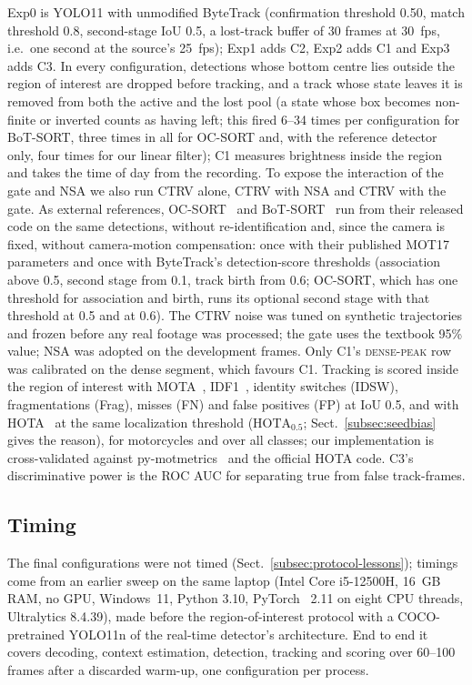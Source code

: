 \documentclass[twocolumn]{svjour3}
\begin{document}
Exp0 is YOLO11 with unmodified ByteTrack (confirmation threshold 0.50, match
threshold 0.8, second-stage IoU 0.5, a lost-track buffer of 30 frames at 30~fps,
i.e.\ one second at the source's 25~fps); Exp1 adds C2, Exp2 adds C1 and Exp3
adds C3. In every configuration, detections whose bottom centre lies outside the
region of interest are dropped before tracking, and a track whose state leaves
it is removed from both the active and the lost pool (a state whose box becomes
non-finite or inverted counts as having left; this fired 6--34 times per
configuration for BoT-SORT, three times in all for OC-SORT and, with the
reference detector only, four times for our linear filter); C1 measures
brightness inside the region and takes the time of day from the recording. To expose the interaction of the gate and NSA we also run
CTRV alone, CTRV with NSA and CTRV with the gate. As external references,
OC-SORT~\cite{Cao2023_ocsort} and BoT-SORT~\cite{Aharon2022_botsort} run from
their released code on the same detections, without re-identification and,
since the camera is fixed, without camera-motion compensation: once with their
published MOT17 parameters and once with ByteTrack's detection-score thresholds
(association above 0.5, second stage from 0.1, track birth from 0.6; OC-SORT,
which has one threshold for association and birth, runs its optional second
stage with that threshold at 0.5 and at 0.6). The CTRV noise was tuned on
synthetic trajectories and frozen before any real footage was processed; the gate
uses the textbook 95\% value; NSA was adopted on the development frames. Only
C1's \textsc{dense-peak} row was calibrated on the dense segment, which favours
C1. Tracking is scored inside the region of interest with
MOTA~\cite{Bernardin2008_mota},
IDF1~\cite{Ristani2016_idf1}, identity switches (IDSW), fragmentations (Frag),
misses (FN) and false positives (FP) at IoU 0.5, and with
HOTA~\cite{Luiten2021_hota} at the same localization threshold
($\mathrm{HOTA}_{0.5}$; Sect.~\ref{subsec:seedbias} gives the reason), for
motorcycles and over all classes; our implementation is cross-validated against
py-motmetrics~\cite{Heindl_pymotmetrics} and the official HOTA code. C3's discriminative power is
the ROC AUC for separating true from false track-frames.

\subsection{Timing}\label{subsec:protocol}

The final configurations were not timed (Sect.~\ref{subsec:protocol-lessons});
timings come from an earlier sweep on the same laptop (Intel Core i5-12500H, 16~GB RAM, no
GPU, Windows~11, Python 3.10, PyTorch~\cite{Paszke2019_pytorch} 2.11 on eight
CPU threads, Ultralytics 8.4.39), made before the region-of-interest protocol
with a COCO-pretrained YOLO11n of the real-time detector's architecture. End to
end it covers decoding, context estimation, detection, tracking and scoring over
60--100 frames after a discarded warm-up, one configuration per process.
\end{document}

